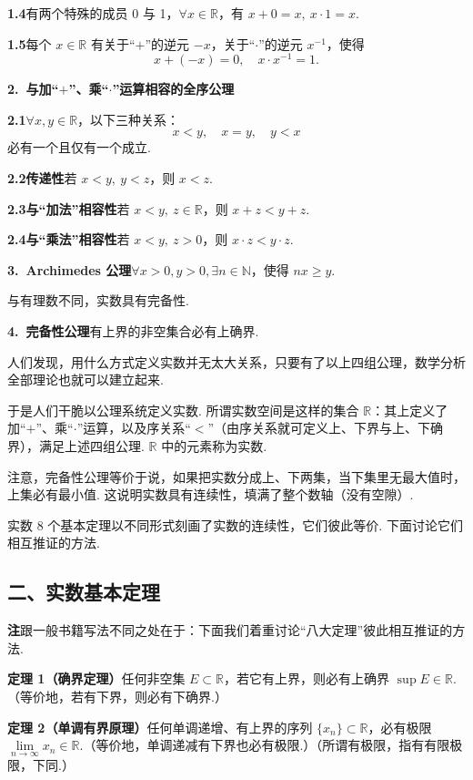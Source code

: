 \documentclass[UTF8, 12pt, fontset=fandol, oneside]{ctexart}
\begin{document}
\noindent\textbf{1.4}\quad 有两个特殊的成员 0 与 1，$\forall x\in\mathbb{R}$，有 $x+0=x,\ x\cdot1=x$.

\noindent\textbf{1.5}\quad 每个 $x\in\mathbb{R}$ 有关于“$+$”的逆元 $-x$，关于“$\cdot$”的逆元 $x^{-1}$，使得
\[
  x+(-x)=0,\quad x\cdot x^{-1}=1.
\]

\noindent\textbf{2.\ 与加“$+$”、乘“$\cdot$”运算相容的全序公理}

\noindent\textbf{2.1}\quad $\forall x,y\in\mathbb{R}$，以下三种关系：
\[
  x<y,\quad x=y,\quad y<x
\]
必有一个且仅有一个成立.

\noindent\textbf{2.2\quad 传递性}\quad 若 $x<y,\ y<z$，则 $x<z$.

\noindent\textbf{2.3\quad 与“加法”相容性}\quad 若 $x<y,\ z\in\mathbb{R}$，则 $x+z<y+z$.

\noindent\textbf{2.4\quad 与“乘法”相容性}\quad 若 $x<y,\ z>0$，则 $x\cdot z<y\cdot z$.

\noindent\textbf{3.\ Archimedes 公理}\quad $\forall x>0,y>0,\exists n\in\mathbb{N}$，使得 $nx\ge y$.

与有理数不同，实数具有完备性.

\noindent\textbf{4.\ 完备性公理}\quad 有上界的非空集合必有上确界.

人们发现，用什么方式定义实数并无太大关系，只要有了以上四组公理，数学分析全部理论也就可以建立起来.

于是人们干脆以公理系统定义实数. 所谓实数空间是这样的集合 $\mathbb{R}$：其上定义了加“$+$”、乘“$\cdot$”运算，以及序关系“$<$”（由序关系就可定义上、下界与上、下确界），满足上述四组公理. $\mathbb{R}$ 中的元素称为实数.

注意，完备性公理等价于说，如果把实数分成上、下两集，当下集里无最大值时，上集必有最小值. 这说明实数具有连续性，填满了整个数轴（没有空隙）.

实数 8 个基本定理以不同形式刻画了实数的连续性，它们彼此等价. 下面讨论它们相互推证的方法.

\subsection*{二、实数基本定理}

\noindent\textbf{注}\quad 跟一般书籍写法不同之处在于：下面我们着重讨论“八大定理”彼此相互推证的方法.

\noindent\textbf{定理 1（确界定理）}\quad 任何非空集 $E\subset\mathbb{R}$，若它有上界，则必有上确界 $\sup E\in\mathbb{R}$.（等价地，若有下界，则必有下确界.）

\noindent\textbf{定理 2（单调有界原理）}\quad 任何单调递增、有上界的序列 $\{x_n\}\subset\mathbb{R}$，必有极限 $\lim\limits_{n\to\infty}x_n\in\mathbb{R}$.（等价地，单调递减有下界也必有极限.）（所谓有极限，指有有限极限，下同.）
\end{document}
